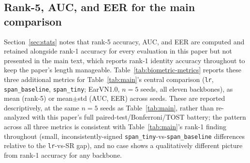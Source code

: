 \documentclass[11pt]{article}
\begin{document}
\subsection{Rank-5, AUC, and EER for the main comparison}
\label{sec:supp-biometric-metrics}

Section~\ref{sec:stats} notes that rank-5 accuracy, AUC, and EER are computed and retained alongside rank-1 accuracy for every evaluation in this paper but not presented in the main text, which reports rank-1 identity accuracy throughout to keep the paper's length manageable. Table~\ref{tab:biometric-metrics} reports these three additional metrics for Table~\ref{tab:main}'s central comparison (\texttt{lr}, \texttt{span\_baseline}, \texttt{span\_tiny}; EarVN1.0, $n=5$ seeds, all eleven backbones), as mean (rank-5) or mean$\pm$std (AUC, EER) across seeds. These are reported descriptively, at the same $n=5$ seeds as Table~\ref{tab:main}, rather than re-analyzed with this paper's full paired-test/Bonferroni/TOST battery; the pattern across all three metrics is consistent with Table~\ref{tab:main}'s rank-1 finding throughout (small, inconsistently-signed \texttt{span\_tiny}-vs-\texttt{span\_baseline} differences relative to the \texttt{lr}-vs-SR gap), and no case shows a qualitatively different picture from rank-1 accuracy for any backbone.
\end{document}
